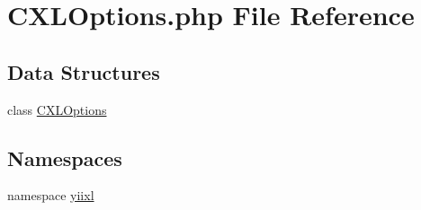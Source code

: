 \hypertarget{CXLOptions_8php}{
\section{CXLOptions.php File Reference}
\label{CXLOptions_8php}
}
\subsection*{Data Structures}
\begin{DoxyCompactItemize}
\item 
class \hyperlink{classCXLOptions}{CXLOptions}
\end{DoxyCompactItemize}
\subsection*{Namespaces}
\begin{DoxyCompactItemize}
\item 
namespace \hyperlink{namespaceyiixl}{yiixl}
\end{DoxyCompactItemize}
